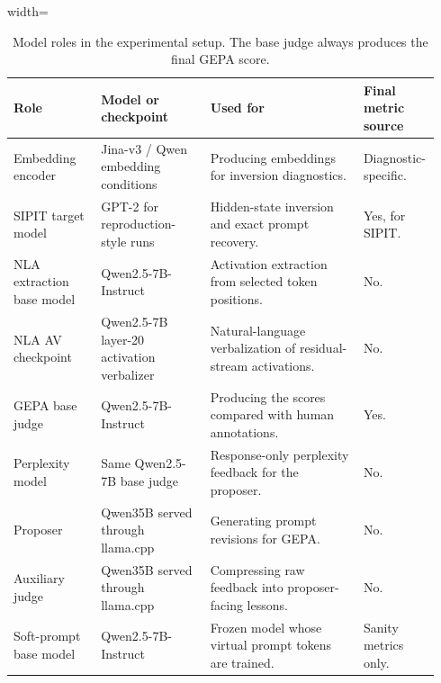 \documentclass[12pt,a4paper,twoside,openright]{book}
\begin{document}
\begin{table}[!htb]
    \centering
    \scriptsize
    \begin{adjustbox}{width=\textwidth}
    \begin{tabular}{p{0.20\linewidth} p{0.25\linewidth} p{0.35\linewidth} p{0.14\linewidth}}
        \toprule
        \textbf{Role} & \textbf{Model or checkpoint} & \textbf{Used for} & \textbf{Final metric source} \\
        \midrule
        Embedding encoder &
        Jina-v3 / Qwen embedding conditions &
        Producing embeddings for inversion diagnostics. &
        Diagnostic-specific. \\
        SIPIT target model &
        GPT-2 for reproduction-style runs &
        Hidden-state inversion and exact prompt recovery. &
        Yes, for SIPIT. \\
        NLA extraction base model &
        Qwen2.5-7B-Instruct &
        Activation extraction from selected token positions. &
        No. \\
        NLA AV checkpoint &
        Qwen2.5-7B layer-20 activation verbalizer &
        Natural-language verbalization of residual-stream activations. &
        No. \\
        GEPA base judge &
        Qwen2.5-7B-Instruct &
        Producing the scores compared with human annotations. &
        Yes. \\
        Perplexity model &
        Same Qwen2.5-7B base judge &
        Response-only perplexity feedback for the proposer. &
        No. \\
        Proposer &
        Qwen35B served through llama.cpp &
        Generating prompt revisions for GEPA. &
        No. \\
        Auxiliary judge &
        Qwen35B served through llama.cpp &
        Compressing raw feedback into proposer-facing lessons. &
        No. \\
        Soft-prompt base model &
        Qwen2.5-7B-Instruct &
        Frozen model whose virtual prompt tokens are trained. &
        Sanity metrics only. \\
        \bottomrule
    \end{tabular}
    \end{adjustbox}
    \caption{Model roles in the experimental setup. The base judge always
    produces the final GEPA score.}
    \label{tab:model-roles}
\end{table}
\end{document}
